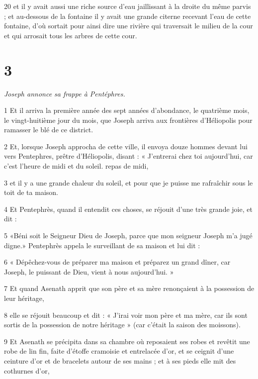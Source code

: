 \par 20 et il y avait aussi une riche source d'eau jaillissant à la droite du même parvis ; et au-dessous de la fontaine il y avait une grande citerne recevant l'eau de cette fontaine, d'où sortait pour ainsi dire une rivière qui traversait le milieu de la cour et qui arrosait tous les arbres de cette cour.

\chapter{3}

\textit{Joseph annonce sa frappe à Pentéphres.}

\par 1 Et il arriva la première année des sept années d'abondance, le quatrième mois, le vingt-huitième jour du mois, que Joseph arriva aux frontières d'Héliopolis pour ramasser le blé de ce district.

\par 2 Et, lorsque Joseph approcha de cette ville, il envoya douze hommes devant lui vers Pentephres, prêtre d'Héliopolis, disant : « J'entrerai chez toi aujourd'hui, car c'est l'heure de midi et du soleil. repas de midi,

\par 3 et il y a une grande chaleur du soleil, et pour que je puisse me rafraîchir sous le toit de ta maison.

\par 4 Et Pentephrès, quand il entendit ces choses, se réjouit d'une très grande joie, et dit :

\par 5 «Béni soit le Seigneur Dieu de Joseph, parce que mon seigneur Joseph m'a jugé digne.» Pentephrès appela le surveillant de sa maison et lui dit :

\par 6 « Dépêchez-vous de préparer ma maison et préparez un grand dîner, car Joseph, le puissant de Dieu, vient à nous aujourd'hui. »

\par 7 Et quand Asenath apprit que son père et sa mère renonçaient à la possession de leur héritage,

\par 8 elle se réjouit beaucoup et dit : « J'irai voir mon père et ma mère, car ils sont sortis de la possession de notre héritage » (car c'était la saison des moissons).

\par 9 Et Asenath se précipita dans sa chambre où reposaient ses robes et revêtit une robe de lin fin, faite d'étoffe cramoisie et entrelacée d'or, et se ceignit d'une ceinture d'or et de bracelets autour de ses mains ; et à ses pieds elle mit des cothurnes d'or,

